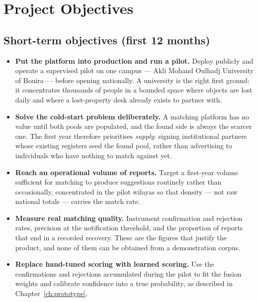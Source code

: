 \section{Project Objectives}

\subsection{Short-term objectives (first 12 months)}

\begin{itemize}[leftmargin=1.4em,itemsep=4pt]
  \item \textbf{Put the platform into production and run a pilot.} Deploy
        publicly and operate a supervised pilot on one campus --- Akli Mohand
        Oulhadj University of Bouira --- before opening nationally. A university
        is the right first ground: it concentrates thousands of people in a
        bounded space where objects are lost daily and where a lost-property
        desk already exists to partner with.

  \item \textbf{Solve the cold-start problem deliberately.} A matching platform
        has no value until both pools are populated, and the found side is
        always the scarcer one. The first year therefore prioritises
        \emph{supply}: signing institutional partners whose existing registers
        seed the found pool, rather than advertising to individuals who have
        nothing to match against yet.

  \item \textbf{Reach an operational volume of reports.} Target a first-year
        volume sufficient for matching to produce suggestions routinely rather
        than occasionally, concentrated in the pilot wilayas so that density ---
        not raw national totals --- carries the match rate.

  \item \textbf{Measure real matching quality.} Instrument confirmation and
        rejection rates, precision at the notification threshold, and the
        proportion of reports that end in a recorded recovery. These are the
        figures that justify the product, and none of them can be obtained from
        a demonstration corpus.

  \item \textbf{Replace hand-tuned scoring with learned scoring.} Use the
        confirmations and rejections accumulated during the pilot to fit the
        fusion weights and calibrate confidence into a true probability, as
        described in Chapter~\ref{ch:prototype}.


\end{itemize}
